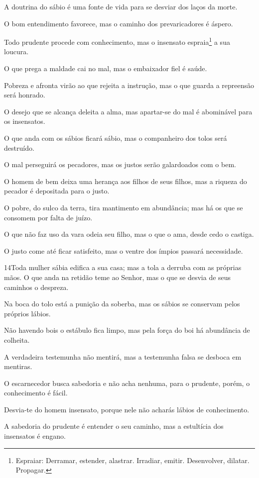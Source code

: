 A doutrina do sábio é uma fonte de vida para se desviar dos laços
da morte.

O bom entendimento favorece, mas o caminho dos prevaricadores é
áspero.

Todo prudente procede com conhecimento, mas o insensato
espraia\footnote{Espraiar: Derramar, estender, alastrar. Irradiar,
emitir. Desenvolver, dilatar. Propagar.} a sua loucura.

O que prega a maldade cai no mal, mas o embaixador fiel é saúde.

Pobreza e afronta virão ao que rejeita a instrução, mas o que
guarda a repreensão será honrado.

O desejo que se alcança deleita a alma, mas apartar-se do mal é
abominável para os insensatos.

O que anda com os sábios ficará sábio, mas o companheiro dos
tolos será destruído.

O mal perseguirá os pecadores, mas os justos serão galardoados
com o bem.

O homem de bem deixa uma herança aos filhos de seus filhos, mas a
riqueza do pecador é depositada para o justo.

O pobre, do sulco da terra, tira mantimento em abundância; mas há
os que se consomem por falta de juízo.

O que não faz uso da vara odeia seu filho, mas o que o ama, desde
cedo o castiga.

O justo come até ficar satisfeito, mas o ventre dos ímpios
passará necessidade.

\medskip

\lettrine{14}{}Toda mulher sábia edifica a sua casa; mas a tola
a derruba com as próprias mãos.  O que anda na
retidão teme ao Senhor, mas o que se desvia de seus caminhos o
despreza.

Na boca do tolo está a punição da soberba, mas os sábios se
conservam pelos próprios lábios.

Não havendo bois o estábulo fica limpo, mas pela força do boi há
abundância de colheita.

A verdadeira testemunha não mentirá, mas a testemunha falsa se
desboca em mentiras.

O escarnecedor busca sabedoria e não acha nenhuma, para o
prudente, porém, o conhecimento é fácil.

Desvia-te do homem insensato, porque nele não acharás lábios de
conhecimento.

A sabedoria do prudente é entender o seu caminho, mas a estultícia
dos insensatos é engano.


